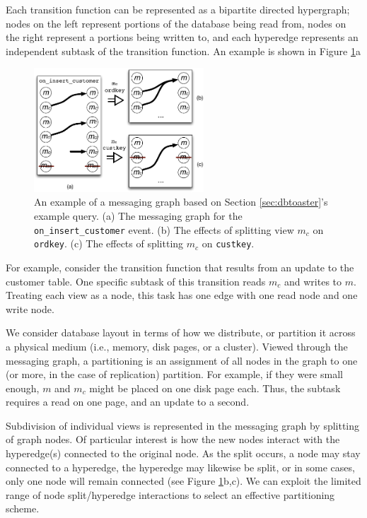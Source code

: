 Each transition function can be represented as a bipartite directed hypergraph; nodes on the left represent portions of the database being read from, nodes on the right represent a portions being written to, and each hyperedge represents an independent subtask of the transition function.  An example is shown in Figure \ref{fig:diag:messagingGraph}a

\begin{figure}
\begin{center}
\includegraphics[width=2.5in]{graphics/MessagingGraph}
\end{center}
\caption{An example of a messaging graph based on Section \ref{sec:dbtoaster}'s example query.  (a) The messaging graph for the \texttt{on\_insert\_customer} event.  (b) The effects of splitting view $m_c$ on \texttt{ordkey}.  (c) The effects of splitting $m_c$ on \texttt{custkey}.}
\label{fig:diag:messagingGraph}
\vspace*{-0.2in}
\end{figure}

For example, consider the transition function that results from an update to the customer table.  One specific subtask of this transition reads $m_c$ and writes to $m$.  Treating each view as a node, this task has one edge with one read node and one write node.  

We consider database layout in terms of how we distribute, or partition it across a physical medium (i.e., memory, disk pages, or a cluster).  Viewed through the messaging graph, a partitioning is an assignment of all nodes in the graph to one (or more, in the case of replication) partition.  For example, if they were small enough, $m$ and $m_c$ might be placed on one disk page each.  Thus, the subtask requires a read on one page, and an update to a second.

Subdivision of individual views is represented in the messaging graph by splitting of graph nodes.  Of particular interest is how the new nodes interact with the hyperedge(s) connected to the original node.  As the split occurs, a node may stay connected to a hyperedge, the hyperedge may likewise be split, or in some cases, only one node will remain connected (see Figure \ref{fig:diag:messagingGraph}b,c).  We can exploit the limited range of node split/hyperedge interactions to select an effective partitioning scheme.

